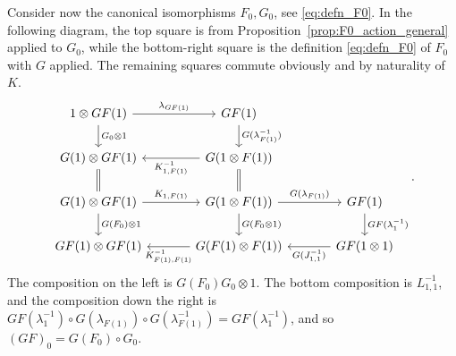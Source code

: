 \documentclass[a4paper,11pt]{article}
\theoremstyle{plain}
\theoremstyle{remark}
\newenvironment{remark}
  {\pushQED{\qed}\renewcommand{\qedsymbol}{$\triangle$}\remarkx}
  {\popQED\endremarkx}
\begin{document}
\begin{remark}
Consider now the canonical isomorphisms $F_0, G_0$, see \eqref{eq:defn_F0}.  In the following diagram, the top square is from Proposition~\ref{prop:F0_action_general} applied to $G_0$, while the bottom-right square is the definition \eqref{eq:defn_F0} of $F_0$ with $G$ applied.  The remaining squares commute obviously and by naturality of $K$.
\[\begin{tikzcd}[column sep=8ex]
  1 \otimes GF(1) \ar[r, "\lambda_{GF(1)}"] \ar[d, "G_0\otimes 1"] & GF(1) \ar[d, "G(\lambda_{F(1)}^{-1})"] \\
  G(1) \otimes GF(1) & G(1\otimes F(1)) \ar[l, "K_{1,F(1)}^{-1}"] \\
  G(1) \otimes GF(1) \ar[u, equals] \ar[r, "K_{1,F(1)}"] \ar[d, "G(F_0) \otimes 1"] & G(1\otimes F(1)) \ar[u, equals] \ar[r, "G(\lambda_{F(1)})"] \ar[d, "G(F_0\otimes 1)"] & GF(1) \ar[d, "GF(\lambda_1^{-1})"] \\
  GF(1) \otimes GF(1) & G(F(1)\otimes F(1)) \ar[l, "K_{F(1), F(1)}^{-1}"] & GF(1\otimes 1) \ar[l, "G(J_{1,1}^{-1})"]
\end{tikzcd}. \]
The composition on the left is $G(F_0)G_0 \otimes 1$.  The bottom composition is $L_{1,1}^{-1}$, and the composition down the right is $GF(\lambda_1^{-1}) \circ G(\lambda_{F(1)}) \circ G(\lambda_{F(1)}^{-1}) = GF(\lambda_1^{-1})$, and so $(GF)_0 = G(F_0)\circ G_0$.
\end{remark}
\end{document}

